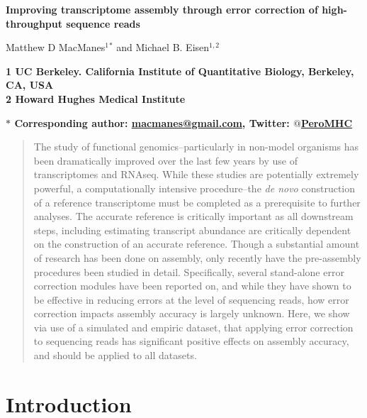 \documentclass[11pt]{article}
\begin{document}
\begin{flushleft}

{\Large
\textbf{Improving transcriptome assembly through error correction of high-throughput sequence reads}
}
\\ 
\vspace{4mm}

\noindent
Matthew D MacManes$^{1}$$^\ast$ and
Michael B. Eisen$^{1,2}$ \\
\vspace{5mm}

\bf{1} \textnormal{UC Berkeley. California Institute of Quantitative Biology, Berkeley, CA, USA} \\
\bf{2} \textnormal{Howard Hughes Medical Institute} \\
\vspace{2mm}
 
\bf{$\ast$} \textnormal{Corresponding author: \href{mailto:macmanes@gmail.com}{macmanes@gmail.com}, Twitter: \href{https://twitter.com/PeroMHC}{$@$PeroMHC}}
\end{flushleft}
\vspace{4mm}

\begin{abstract}
\noindent
The study of functional genomics--particularly in non-model organisms has been dramatically improved over the last few years by use of transcriptomes and RNAseq. While these studies are potentially extremely powerful, a computationally intensive procedure--the \textit{de novo} construction of a reference transcriptome must be completed as a prerequisite to further analyses. The accurate reference is critically important as all downstream steps, including estimating transcript abundance are critically dependent on the construction of an accurate reference. Though a substantial amount of research has been done on assembly, only recently have the pre-assembly procedures been studied in detail. Specifically, several stand-alone error correction modules have been reported on, and while they have shown to be effective in reducing errors at the level of sequencing reads, how error correction impacts assembly accuracy is largely unknown. Here, we show via use of a simulated and empiric dataset, that applying error correction to sequencing reads has significant positive effects on assembly accuracy, and should be applied to all datasets. 
\end{abstract}

\linenumbers

\section*{Introduction}
\end{document}
